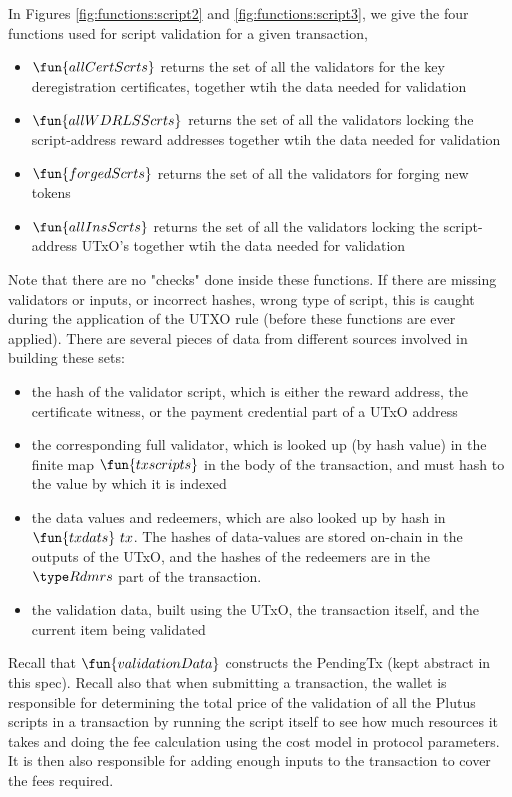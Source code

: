 In Figures \ref{fig:functions:script2} and \ref{fig:functions:script3},
we give the four functions
used for script validation for a given transaction,

\begin{itemize}
\item $\fun{allCertScrts}$ returns the set of all the validators for the
key deregistration certificates, together
wtih the data needed for validation
\item $\fun{allWDRLSScrts}$ returns the set of all the validators locking
the script-address reward addresses together
wtih the data needed for validation
\item $\fun{forgedScrts}$ returns the set of all the validators for
forging new tokens
\item $\fun{allInsScrts}$ returns the set of all the validators locking
the script-address UTxO's together
wtih the data needed for validation
\end{itemize}

Note that there are no "checks" done inside these functions. If there are
missing validators or inputs, or incorrect hashes, wrong type of script,
this is caught during the application of the UTXO
rule (before these functions are ever applied).
There are several pieces of data from different sources involved in building these
sets:

\begin{itemize}
\item the hash of the validator script, which is either the reward address,
the certificate witness, or the payment credential part of a UTxO address

\item the corresponding
full validator, which is looked up (by hash value) in the finite map $\fun{txscripts}$ in the
body of the transaction, and must hash to the value by which it is indexed

\item the data values and redeemers, which are also looked up by hash in $\fun{txdats}~{tx}$.
The hashes of data-values are stored on-chain in the outputs of the UTxO, and
the hashes of the redeemers are in the $\Rdmrs$ part of the transaction.

\item the validation data, built using the UTxO, the transaction itself,
and the current item being validated
\end{itemize}

Recall that $\fun{validationData}$ constructs the PendingTx (kept abstract
in this spec).
Recall also that when submitting a transaction, the wallet is responsible for
determining the total price of the
validation of all the Plutus scripts in a transaction
by running the script itself to see how much resources it takes and doing the
fee calculation using the cost model in protocol parameters. It is then
also responsible for adding enough inputs to the transaction to cover the
fees required.

